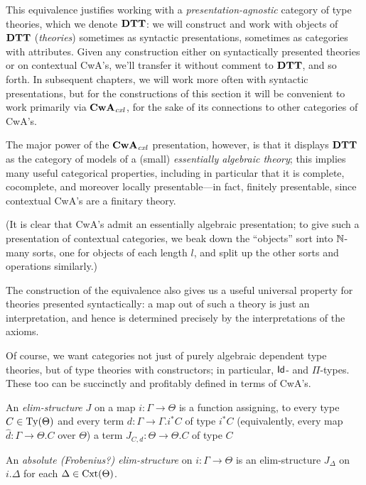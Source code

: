\begin{para}This equivalence justifies working with a \emph{presentation-agnostic} category of type theories, which we denote $\mathbf{DTT}$: we will construct and work with objects of $\mathbf{DTT}$ (\emph{theories}) sometimes as syntactic presentations, sometimes as categories with attributes.  Given any construction either on syntactically presented theories or on contextual CwA's, we'll transfer it without comment to $\mathbf{DTT}$, and so forth.  In subsequent chapters, we will work more often with syntactic presentations, but for the constructions of this section it will be convenient to work primarily via $\mathbf{CwA}_{\mathit{cxl}}$, for the sake of its connections to other categories of CwA's.

The major power of the $\mathbf{CwA}_{\mathit{cxl}}$ presentation, however, is that it displays $\mathbf{DTT}$ as the category of models of a (small) \emph{essentially algebraic theory}; this implies many useful categorical properties, including in particular that it is complete, cocomplete, and moreover locally presentable---in fact, finitely presentable, since contextual CwA's are a finitary theory.

(It is clear that CwA's admit an essentially algebraic presentation; to give such a presentation of contextual categories, we beak down the ``objects'' sort into $\mathbb{N}$-many sorts, one for objects of each length $l$, and split up the other sorts and operations similarly.)

The construction of the equivalence also gives us a useful universal property for theories presented syntactically: a map out of such a theory is just an interpretation, and hence is determined precisely by the interpretations of the axioms.
\end{para}

\begin{para}Of course, we want categories not just of purely algebraic dependent type theories, but of type theories with constructors; in particular, $\mathsf{Id}$- and $\Pi$-types.  These too can be succinctly and profitably defined in terms of CwA's.
\end{para}

\begin{definition} An \emph{elim-structure} $J$ on a map $i : \Gamma \to \Theta$ is a function assigning, to every type $C \in \mathrm{Ty}(\Theta)$ and every term $d : \Gamma \to \Gamma.i^*C$ of type $i^*C$ (equivalently, every map $\hat{d} : \Gamma \to \Theta.C$ over $\Theta$) a term $J_{C,d} : \Theta \to \Theta.C$ of type $C$

An \emph{absolute (Frobenius?) elim-structure} on $i : \Gamma \to \Theta$ is an elim-structure $J_\Delta$ on $i.\Delta$ for each $\Delta \in \mathrm{Cxt}(\Theta)$.
\end{definition}

